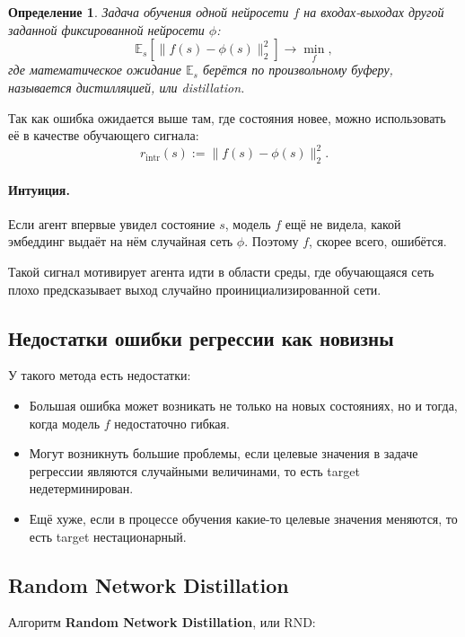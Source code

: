 \documentclass[12pt,a4paper]{article}
\newtheorem{definition}{Определение}
\begin{document}
\begin{definition}
Задача обучения одной нейросети $f$ на входах-выходах другой заданной фиксированной нейросети $\phi$:
\[
\mathbb E_s
\left[
\|f(s)-\phi(s)\|_2^2
\right]
\to
\min_f,
\]
где математическое ожидание $\mathbb E_s$ берётся по произвольному буферу, называется дистилляцией, или distillation.
\end{definition}

Так как ошибка ожидается выше там, где состояния новее, можно использовать её в качестве обучающего сигнала:
\[
r_{\mathrm{intr}}(s)
:=
\|f(s)-\phi(s)\|_2^2.
\]

\paragraph{Интуиция.}

Если агент впервые увидел состояние $s$, модель $f$ ещё не видела, какой эмбеддинг выдаёт на нём случайная сеть $\phi$. Поэтому $f$, скорее всего, ошибётся.

Такой сигнал мотивирует агента идти в области среды, где обучающаяся сеть плохо предсказывает выход случайно проинициализированной сети.

\subsection{Недостатки ошибки регрессии как новизны}

У такого метода есть недостатки:

\begin{itemize}
    \item Большая ошибка может возникать не только на новых состояниях, но и тогда, когда модель $f$ недостаточно гибкая.
    \item Могут возникнуть большие проблемы, если целевые значения в задаче регрессии являются случайными величинами, то есть target недетерминирован.
    \item Ещё хуже, если в процессе обучения какие-то целевые значения меняются, то есть target нестационарный.
\end{itemize}

\subsection{Random Network Distillation}

Алгоритм \textbf{Random Network Distillation}, или RND:
\end{document}
